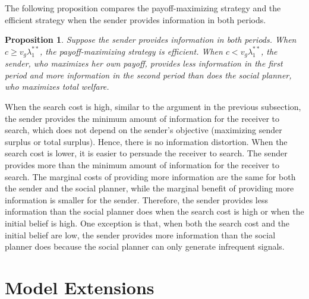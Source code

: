 \documentclass[11pt]{extarticle}
\newtheorem{proposition}{Proposition}
\begin{document}
The following proposition compares the payoff-maximizing strategy and the efficient strategy when the sender provides information in both periods. 
\begin{proposition}\label{estrategy2p}
	Suppose the sender provides information in both periods. When $c \geq v_g\lambda_1^{**}$, the payoff-maximizing strategy is efficient. When $c < v_g\lambda_1^{**}$, the sender, who maximizes her own payoff, provides less information in the first period and more information in the second period than does the social planner, who maximizes total welfare.
\end{proposition}
When the search cost is high, similar to the argument in the previous subsection, the sender provides the minimum amount of information for the receiver to search, which does not depend on the sender's objective (maximizing sender surplus or total surplus). Hence, there is no information distortion. When the search cost is lower, %
it is easier to persuade the receiver to search. The sender provides more than the minimum amount of information for the receiver to search. The marginal costs of providing more information are the same for both the sender and the social planner, while the marginal benefit of providing more information is smaller for the sender. Therefore, the sender provides less information than the social planner does when the search cost is high or when the initial belief is high. One exception is that, when both the search cost and the initial belief are low, %
the sender provides more information than the social planner does because the social planner can only generate infrequent signals.



 
\section{Model Extensions}
\end{document}
